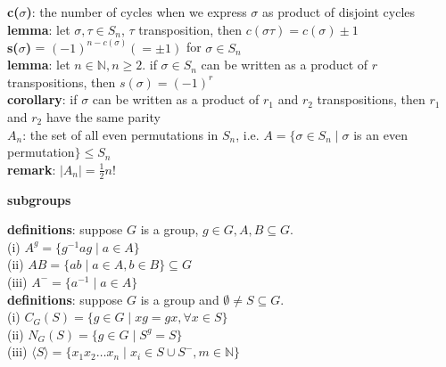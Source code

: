 \documentclass[a4paper]{article}
\begin{document}
\begin{multicols}{2}
\begin{framed}
	\noindent
	\textbf{c($\sigma$)}: the number of cycles when we express $\sigma$ as product of disjoint cycles\\
	
	\noindent
	\textbf{lemma}: let $\sigma, \tau \in S_n$, $\tau$ transposition, then $c(\sigma\tau) = c(\sigma) \pm 1$\\
	
	\noindent
	\textbf{s($\sigma$)} = $(-1)^{n - c(\sigma)} (= \pm 1)$ for $\sigma \in S_n$\\
	
	\noindent
	\textbf{lemma}: let $n \in \mathbb{N}, n \geq 2$. if $\sigma \in S_n$ can be written as a product of $r$ transpositions, then $s(\sigma) = (-1)^r$\\
	
	\noindent
	\textbf{corollary}: if $\sigma$ can be written as a product of $r_1$ and $r_2$ transpositions, then $r_1$ and $r_2$ have the same parity\\
	
	\noindent
	\textbf{$A_n$}: the set of all even permutations in $S_n$, i.e. $A = \{ \sigma \in S_n \; \vert \; \sigma$ is an even permutation$\} \leq S_n$\\
	
	\noindent
	\textbf{remark}: $\vert A_n \vert = \frac{1}{2}n!$
\end{framed}

\begin{framed}
	\begin{center}
		\textbf{subgroups}	
	\end{center}
	
	\noindent
	\textbf{definitions}: suppose $G$ is a group, $g \in G, A, B \subseteq G$.\\
	(i) $A^g = \{g^{-1}ag \; \vert \; a \in A\}$\\
	(ii) $AB = \{ab \; \vert \; a \in A, b \in B\} \subseteq G$\\
	(iii) $A^- = \{a^{-1} \; \vert \; a \in A\}$\\
	
	\noindent
	\textbf{definitions}: suppose $G$ is a group and $\emptyset \neq S \subseteq G$.\\
	(i) $C_G(S) = \{g \in G \; \vert \; xg = gx, \forall x \in S\}$\\
	(ii) $N_G(S) = \{g \in G \; \vert \; S^g = S\}$\\
	(iii) $\langle S \rangle = \{x_1x_2\dots x_n \; \vert \; x_i \in S \cup S^-, m \in \mathbb{N}\}$\\
	

\end{framed}
\end{multicols}
\end{document}
